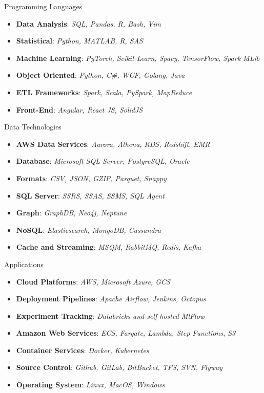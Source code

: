 
\Technology
{Programming Languages}
{\faCode}
{\begin{itemize}
    \item \textbf{Data Analysis}:
      \emph{SQL, Pandas, R, Bash, Vim}
    \item \textbf{Statistical}:
      \emph{Python, MATLAB, R, SAS}
    \item \textbf{Machine Learning}:
      \emph{PyTorch, Scikit-Learn, Spacy, TensorFlow, Spark MLib}
    \item \textbf{Object Oriented}:
      \emph{Python, C\#, WCF, Golang, Java}
    \item \textbf{ETL Frameworks}:
      \emph{Spark, Scala, PySpark, MapReduce}
    \item \textbf{Front-End}:
      \emph{Angular, React JS, SolidJS}
\end{itemize}}

\vspace*{0.01 in}

\Technology
{Data Technologies}
{\faDatabase}
{\begin{itemize}
    \item \textbf{AWS Data Services}:
      \emph{Aurora, Athena, RDS, Redshift, EMR}
    \item \textbf{Database}:
      \emph{Microsoft SQL Server, PostgreSQL, Oracle}
    \item \textbf{Formats}:
      \emph{CSV, JSON, GZIP, Parquet, Snappy}
    \item \textbf{SQL Server}:
      \emph{SSRS, SSAS, SSMS, SQL Agent}
    \item \textbf{Graph}:
      \emph{GraphDB, Neo4j, Neptune}
    \item \textbf{NoSQL}:
      \emph{Elasticsearch, MongoDB, Cassandra}
    \item \textbf{Cache and Streaming}:
      \emph{MSQM, RabbitMQ, Redis, Kafka}
\end{itemize}}

\vspace*{0.01 in}

\Technology
{Applications}
{\faLinux}
{\begin{itemize}
    \item \textbf{Cloud Platforms}:
      \emph{AWS, Microsoft Azure, GCS}
    \item \textbf{Deployment Pipelines}:
    \emph{Apache Airflow, Jenkins, Octopus}
    \item \textbf{Experiment Tracking}:
      \emph{Databricks and self-hosted MlFlow}
    \item \textbf{Amazon Web Services}:
      \emph{ECS, Fargate, Lambda, Step Functions, S3}
    \item \textbf{Container Services}:
      \emph{Docker, Kubernetes}
    \item \textbf{Source Control}:
      \emph{Github, GitLab, BitBucket, TFS, SVN, Flyway}
    \item \textbf{Operating System}:
      \emph{Linux, MacOS, Windows}
\end{itemize}}
